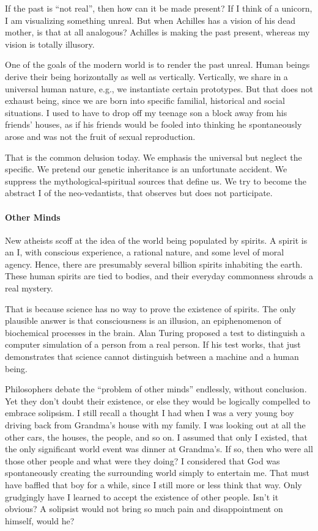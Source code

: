 If the past is ``not real'', then how can it be made present? If I think of a unicorn, I am visualizing something unreal. But when Achilles has a vision of his dead mother, is that at all analogous? Achilles is making the past present, whereas my vision is totally illusory.

One of the goals of the modern world is to render the past unreal. Human beings derive their being horizontally as well as vertically. Vertically, we share in a universal human nature, e.g., we instantiate certain prototypes. But that does not exhaust being, since we are born into specific familial, historical and social situations. I used to have to drop off my teenage son a block away from his friends' houses, as if his friends would be fooled into thinking he spontaneously arose and was not the fruit of sexual reproduction.

That is the common delusion today. We emphasis the universal but neglect the specific. We pretend our genetic inheritance is an unfortunate accident. We suppress the mythological-spiritual sources that define us. We try to become the abstract I of the neo-vedantists, that observes but does not participate.

\paragraph{Other Minds}


New atheists scoff at the idea of the world being populated by spirits. A spirit is an I, with conscious experience, a rational nature, and some level of moral agency. Hence, there are presumably several billion spirits inhabiting the earth. These human spirits are tied to bodies, and their everyday commonness shrouds a real mystery.

That is because science has no way to prove the existence of spirits. The only plausible answer is that consciousness is an illusion, an epiphenomenon of biochemical processes in the brain. Alan Turing proposed a test to distinguish a computer simulation of a person from a real person. If his test works, that just demonstrates that science cannot distinguish between a machine and a human being.

Philosophers debate the ``problem of other minds'' endlessly, without conclusion. Yet they don't doubt their existence, or else they would be logically compelled to embrace solipsism. I still recall a thought I had when I was a very young boy driving back from Grandma's house with my family. I was looking out at all the other cars, the houses, the people, and so on. I assumed that only I existed, that the only significant world event was dinner at Grandma's. If so, then who were all those other people and what were they doing? I considered that God was spontaneously creating the surrounding world simply to entertain me. That must have baffled that boy for a while, since I still more or less think that way. Only grudgingly have I learned to accept the existence of other people. Isn't it obvious? A solipsist would not bring so much pain and disappointment on himself, would he?


